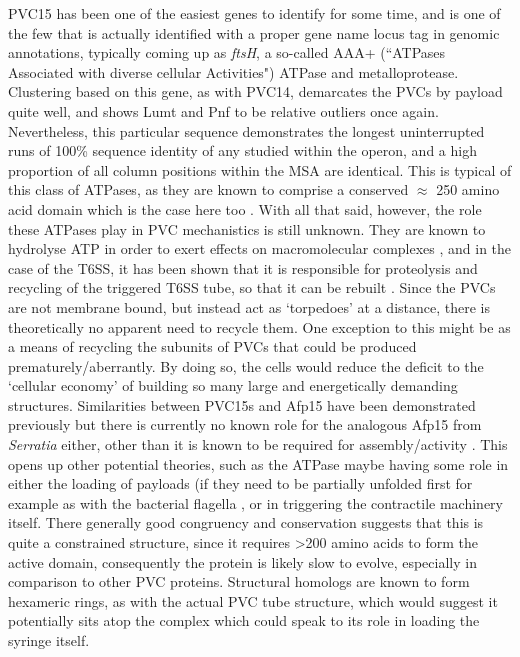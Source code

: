 PVC15 has been one of the easiest genes to identify for some time, and is one of the few that is actually identified with a proper gene name locus tag in genomic annotations, typically coming up as \emph{ftsH}, a so-called AAA+ (``ATPases Associated with diverse cellular Activities") ATPase and metalloprotease. Clustering based on this gene, as with PVC14, demarcates the PVCs by payload quite well, and shows Lumt and Pnf to be relative outliers once again. Nevertheless, this particular sequence demonstrates the longest uninterrupted runs of 100\% sequence identity of any studied within the operon, and a high proportion of all column positions within the MSA are identical. This is typical of this class of ATPases, as they are known to comprise a conserved $\approx$ 250 amino acid domain which is the case here too \citep{Hanson2005}. With all that said, however, the role these ATPases play in PVC mechanistics is still unknown. They are known to hydrolyse ATP in order to exert effects on macromolecular complexes \citep{Erzberger2006}, and in the case of the T6SS, it has been shown that it is responsible for proteolysis and recycling of the triggered T6SS tube, so that it can be rebuilt \citep{Bonemann2009, Forster2014}. Since the PVCs are not membrane bound, but instead act as `torpedoes' at a distance, there is theoretically no apparent need to recycle them. One exception to this might be as a means of recycling the subunits of PVCs that could be produced prematurely/aberrantly. By doing so, the cells would reduce the deficit to the `cellular economy' of building so many large and energetically demanding structures. Similarities between PVC15s and Afp15 have been demonstrated previously but there is currently no known role for the analogous Afp15 from \emph{Serratia} either, other than it is known to be required for assembly/activity \citep{Hurst2004, Hurst2018}. This opens up other potential theories, such as the ATPase maybe having some role in either the loading of payloads (if they need to be partially unfolded first for example as with the bacterial flagella \citep{Muskotal2006}, or in triggering the contractile machinery itself. There generally good congruency and conservation suggests that this is quite a constrained structure, since it requires \textgreater 200 amino acids to form the active domain, consequently the protein is likely slow to evolve, especially in comparison to other PVC proteins. Structural homologs are known to form hexameric rings, as with the actual PVC tube structure, which would suggest it potentially sits atop the complex which could speak to its role in loading the syringe itself.

